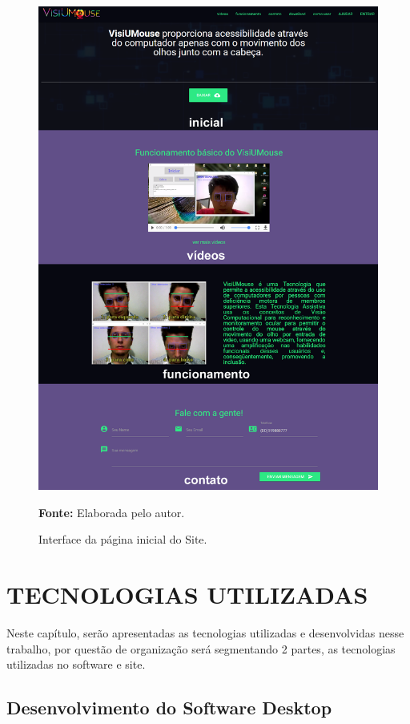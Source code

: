 \begin{figure}[htbp]
\caption{Interface da página inicial do Site.} 
\centering \includegraphics[scale=.33]{img/site.png}

{\fontsize{11}{11}\selectfont \textbf{Fonte:} Elaborada pelo autor.}
\label{fig:site}
\end{figure}

\chapter{TECNOLOGIAS UTILIZADAS}\label{CAP6-tecnilogias-utilizadas}
Neste capítulo, serão apresentadas as tecnologias utilizadas e desenvolvidas nesse trabalho, por questão de organização será segmentando 2 partes, as tecnologias utilizadas no software e site.

\section{Desenvolvimento do Software Desktop}\label{Sub:tecnologias-software}

